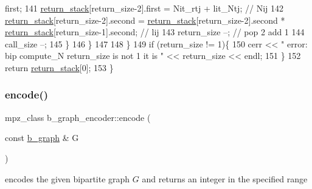 \begin{DoxyCode}
      first;
141         \hyperlink{namespacehelper__vars_a6d2100c373830cacd232319a9958652d}{return\_stack}[return\_size-2].first = Nit\_rtj + lit\_Ntj; \textcolor{comment}{// Nij}
142         \hyperlink{namespacehelper__vars_a6d2100c373830cacd232319a9958652d}{return\_stack}[return\_size-2].second = \hyperlink{namespacehelper__vars_a6d2100c373830cacd232319a9958652d}{return\_stack}[return\_size-2].second * 
      \hyperlink{namespacehelper__vars_a6d2100c373830cacd232319a9958652d}{return\_stack}[return\_size-1].second; \textcolor{comment}{// lij}
143         return\_size --; \textcolor{comment}{// pop 2 add 1}
144         call\_size --;
145       \}
146     \}
147 
148   \}
149   \textcolor{keywordflow}{if} (return\_size != 1)\{
150     cerr << \textcolor{stringliteral}{" error: bip compute\_N return\_size is not 1 it is "} << return\_size << endl;
151   \}
152   \textcolor{keywordflow}{return} \hyperlink{namespacehelper__vars_a6d2100c373830cacd232319a9958652d}{return\_stack}[0];
153 \}
\end{DoxyCode}
\mbox{\label{classb__graph__encoder_a9dbf40f42a2eb12822b14ca10d580763}} 
\subsubsection{\texorpdfstring{encode()}{encode()}}
{\footnotesize\ttfamily mpz\+\_\+class b\+\_\+graph\+\_\+encoder\+::encode (\begin{DoxyParamCaption}\item[{const \hyperlink{classb__graph}{b\+\_\+graph} \&}]{G }\end{DoxyParamCaption})}



encodes the given bipartite graph $G$ and returns an integer in the specified range 


